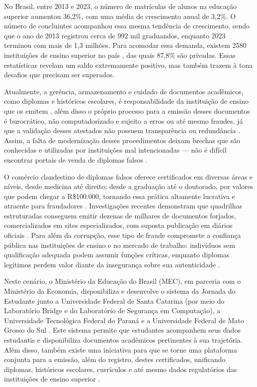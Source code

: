 No Brasil, entre 2013 e 2023, o número de matrículas de alunos na educação superior aumentou 36,2\%, com uma média de crescimento anual de 3,2\%. O número de concluintes acompanhou essa mesma tendência de crescimento, sendo que o ano de 2013 registrou cerca de 992 mil graduandos, enquanto 2023 terminou com mais de 1,3 milhões. Para acomodar essa demanda, existem 2580 instituições de ensino superior no país \cite{inep}, das quais 87,8\% são privadas. Essas estatísticas revelam um saldo extremamente positivo, mas também trazem à tona desafios que precisam ser superados.

Atualmente, a gerência, armazenamento e cuidado de documentos acadêmicos, como diplomas e históricos escolares, é responsabilidade da instituição de ensino que os emitem \cite{mec}, além disso o próprio processo para a emissão desses documentos é burocrático, não computadorizado e sujeito a erros ou até mesmo fraudes, já que a validação desses atestados não possuem transparência ou redundância \cite{smartcontracts}. Assim, a falta de modernização desses procedimentos deixam brechas que são conhecidas e utilizadas por instituições mal intencionadas — não é difícil encontrar portais de venda de diplomas falsos \cite{noticiadiploma}.

O comércio clandestino de diplomas falsos oferece certificados em diversas áreas e níveis, desde medicina até direito; desde a graduação até o doutorado, por valores que podem chegar a R\$100.000, tornando essa prática altamente lucrativa e atraente para fraudadores \cite{smartcontracts}. Investigações recentes demonstram que quadrilhas estruturadas conseguem emitir dezenas de milhares de documentos forjados, comercializados em sites especializados, com suposta publicação em diários oficiais \cite{noticiadiploma2}. Para além da corrupção, esse tipo de fraude compromete a confiança pública nas instituições de ensino e no mercado de trabalho: indivíduos sem qualificação adequada podem assumir funções críticas, enquanto diplomas legítimos perdem valor diante da insegurança sobre sua autenticidade \cite{clusterfraudverification}.

Neste cenário, o Ministério da Educação do Brasil (MEC), em parceria com o Ministério da Economia, disponibiliza e desenvolve o sistema da Jornada do Estudante junto a Universidade Federal de Santa Catarina (por meio do Laboratório Bridge e do Laboratório de Segurança em Computação), a Universidade Tecnológica Federal do Paraná e a Universidade Federal de Mato Grosso do Sul \cite{jornada}. Este sistema permite que estudantes acompanhem seus dados estudantis e disponibiliza documentos acadêmicos pertinentes à sua trajetória. Além disso, também existe uma iniciativa para que se torne uma plataforma conjunta para a emissão, além do registro, destes certificados, unificando diplomas, históricos escolares, currículos e até mesmo dados regulatórios das instituições de ensino superior \cite{videojornada}.

